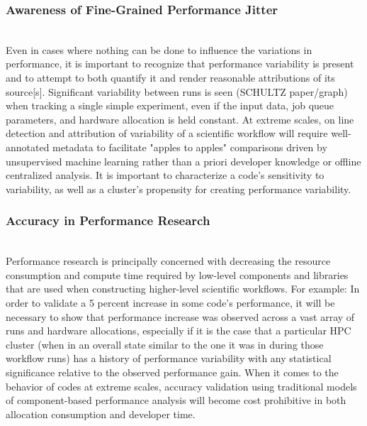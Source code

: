 \subsubsection{Awareness of Fine-Grained Performance Jitter}
\\
Even in cases where nothing can be done to influence the variations in 
performance, it is important to recognize that performance variability is 
present and to  attempt to both quantify it and render reasonable attributions 
of its source[s]. Significant variability between runs is seen (SCHULTZ 
paper/graph) when tracking a single simple experiment, even if the input data, 
job queue  parameters, and hardware allocation is held constant. At extreme 
scales, on line detection and attribution of variability of a 
scientific workflow will require well-annotated metadata to facilitate "apples 
to apples" comparisons driven by unsupervised machine learning rather than a 
priori developer knowledge or offline centralized analysis. It is important to 
characterize a code's sensitivity to variability, as well as a cluster's 
propensity for creating performance variability.
\subsubsection{Accuracy in Performance Research}
\\
Performance research is principally concerned with decreasing the resource 
consumption and compute time required by low-level components and libraries 
that are used when constructing higher-level scientific workflows. For example: 
In order to 
validate a 5 percent increase in some code's performance, it will be necessary 
to show that  performance increase was observed across a vast array of runs and 
hardware allocations, especially if it is the case that a particular HPC 
cluster (when in an overall state similar to the one it was in during those 
workflow runs) has a history of performance variability with any statistical 
significance relative to the observed performance gain. When it comes to the 
behavior of codes at extreme scales, accuracy validation using traditional 
models of component-based performance analysis will become cost prohibitive in 
both allocation consumption and developer time.
